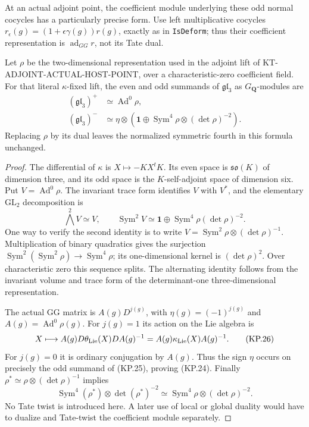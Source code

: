 At an actual adjoint point, the coefficient module underlying
these odd normal cocycles has a particularly precise form.
Use left multiplicative cocycles
$r_\epsilon(g)=(1+\epsilon\gamma(g))r(g)$, exactly as in
\texttt{IsDeform}; thus their coefficient representation is
$\operatorname{ad}_{GG}r$, not its Tate dual.

\begin{lemma}
Let $\rho$ be the two-dimensional representation used in the
adjoint lift of KT-ADJOINT-ACTUAL-HOST-POINT, over a
characteristic-zero coefficient field.  For that literal
$\kappa$-fixed lift, the even and odd summands of
$\mathfrak{gl}_3$ as $G_{\mathbf Q}$-modules are
\[
 \begin{split}
   (\mathfrak{gl}_3)^+&\simeq\operatorname{Ad}^0\rho,\\
   (\mathfrak{gl}_3)^-&\simeq
       \eta\otimes\left(\mathbf1\oplus
                    \operatorname{Sym}^4\rho\otimes(\det\rho)^{-2}\right).
 \end{split}                                                     \tag{KP.24}
\]
Replacing $\rho$ by its dual leaves the normalized symmetric
fourth in this formula unchanged.
\end{lemma}
\begin{proof}
The differential of $\kappa$ is $X\mapsto-KX^tK$.
Its even space is $\mathfrak{so}(K)$ of dimension three,
and its odd space is the $K$-self-adjoint space of dimension
six.  Put $V=\operatorname{Ad}^0\rho$.  The invariant trace
form identifies $V$ with $V^*$, and the elementary
$\mathrm{GL}_2$ decomposition is
\[
 \bigwedge^2 V\simeq V,\qquad
 \operatorname{Sym}^2 V\simeq\mathbf1\oplus
                      \operatorname{Sym}^4\rho(\det\rho)^{-2}.
                                                                  \tag{KP.25}
\]
One way to verify the second identity is to write
$V=\operatorname{Sym}^2\rho\otimes(\det\rho)^{-1}$.
Multiplication of binary quadratics gives the surjection
$\operatorname{Sym}^2(\operatorname{Sym}^2\rho)
\to\operatorname{Sym}^4\rho$; its one-dimensional kernel is
$(\det\rho)^2$.  Over characteristic zero this sequence
splits.  The alternating identity follows from the
invariant volume and trace form of the determinant-one
three-dimensional representation.

The actual GG matrix is $A(g)D^{j(g)}$, with
$\eta(g)=(-1)^{j(g)}$ and $A(g)=\operatorname{Ad}^0\rho(g)$.
For $j(g)=1$ its action on the Lie algebra is
\[
   X\longmapsto A(g)D\theta_{\rm Lie}(X)D A(g)^{-1}
              =A(g)\kappa_{\rm Lie}(X)A(g)^{-1}.             \tag{KP.26}
\]
For $j(g)=0$ it is ordinary conjugation by $A(g)$.  Thus
the sign $\eta$ occurs on precisely the odd summand of
(KP.25), proving (KP.24).  Finally
$\rho^*\simeq\rho\otimes(\det\rho)^{-1}$ implies
\[
 \operatorname{Sym}^4(\rho^*)\otimes\det(\rho^*)^{-2}
       \simeq\operatorname{Sym}^4\rho\otimes(\det\rho)^{-2}.
\]
No Tate twist is introduced here.  A later use of local or
global duality would have to dualize and Tate-twist the
coefficient module separately.
\end{proof}

